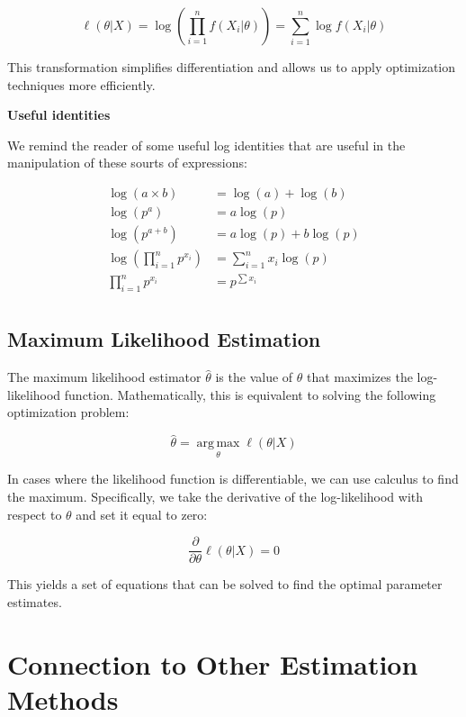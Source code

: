 \documentclass[
  12 pt,
  a4paper,
]{book}
\numberwithin{equation}{section}
\theoremstyle{plain}      %
\theoremstyle{definition} %
\theoremstyle{remark}     %
\theoremstyle{note}         %
\begin{document}
\[
\ell(\theta | X) = \log \left( \prod_{i=1}^{n} f(X_i | \theta) \right) = \sum_{i=1}^{n} \log f(X_i | \theta)
\]

This transformation simplifies differentiation and allows us to apply
optimization techniques more efficiently.

\textbf{Useful identities}

We remind the reader of some useful log identities that are useful in
the manipulation of these sourts of expressions:

\[
\begin{aligned}
\log(a \times b) &= \log(a) + \log(b)\\
\log \left(p^{a}\right)&=a \log (p) \\
\log \left(p^{a+b}\right)&=a \log (p)+b \log (p) \\
\log \left(\prod_{i=1}^{n} p^{x_{i}}\right)&=\sum_{i=1}^{n} x_{i} \log (p)\\ 
\prod_{i=1}^{n} p^{x_{i}}&=p^{\sum x_{i}} \\
\end{aligned}
\]

\hypertarget{maximum-likelihood-estimation}{%
\subsection{Maximum Likelihood
Estimation}\label{maximum-likelihood-estimation}}

The maximum likelihood estimator \(\hat{\theta}\) is the value of
\(\theta\) that maximizes the log-likelihood function. Mathematically,
this is equivalent to solving the following optimization problem:

\[
\hat{\theta} = \underset{\theta}{ \mathop{\mathrm{arg\,max}}} \ell(\theta | X)
\]

In cases where the likelihood function is differentiable, we can use
calculus to find the maximum. Specifically, we take the derivative of
the log-likelihood with respect to \(\theta\) and set it equal to zero:

\[
\frac{\partial}{\partial \theta} \ell(\theta | X) = 0
\]

This yields a set of equations that can be solved to find the optimal
parameter estimates.

\hypertarget{connection-to-other-estimation-methods}{%
\section{Connection to Other Estimation
Methods}\label{connection-to-other-estimation-methods}}
\end{document}
